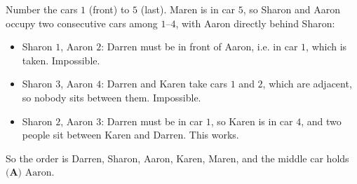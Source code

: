 Number the cars $1$ (front) to $5$ (last). Maren is in car $5$, so Sharon and Aaron occupy two consecutive cars among $1$--$4$, with Aaron directly behind Sharon:
\begin{itemize}
\item Sharon $1$, Aaron $2$: Darren must be in front of Aaron, i.e. in car $1$, which is taken. Impossible.
\item Sharon $3$, Aaron $4$: Darren and Karen take cars $1$ and $2$, which are adjacent, so nobody sits between them. Impossible.
\item Sharon $2$, Aaron $3$: Darren must be in car $1$, so Karen is in car $4$, and two people sit between Karen and Darren. This works.
\end{itemize}
So the order is Darren, Sharon, Aaron, Karen, Maren, and the middle car holds $\boxed{\textbf{(A) }\text{Aaron}}$.
